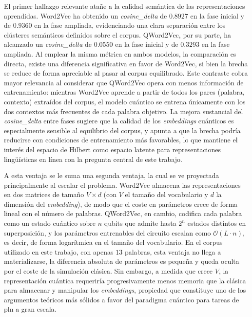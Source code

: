 El primer hallazgo relevante atañe a la calidad semántica de las representaciones aprendidas. Word2Vec ha obtenido un \textit{cosine\_delta} de $0.8927$ en la fase inicial y de $0.9360$ en la fase ampliada, evidenciando una clara separación entre los clústeres semánticos definidos sobre el corpus. QWord2Vec, por su parte, ha alcanzado un \textit{cosine\_delta} de $0.0550$ en la fase inicial y de $0.3293$ en la fase ampliada. Al emplear la misma métrica en ambos modelos, la comparación es directa, existe una diferencia significativa en favor de Word2Vec, si bien la brecha se reduce de forma apreciable al pasar al corpus equilibrado. Este contraste cobra mayor relevancia al considerar que QWord2Vec opera con menos información de entrenamiento: mientras Word2Vec aprende a partir de todos los pares (palabra, contexto) extraídos del corpus, el modelo cuántico se entrena únicamente con los dos contextos más frecuentes de cada palabra objetivo. La mejora sustancial del \textit{cosine\_delta} entre fases sugiere que la calidad de los \textit{embeddings} cuánticos es especialmente sensible al equilibrio del corpus, y apunta a que la brecha podría reducirse con condiciones de entrenamiento más favorables, lo que mantiene el interés del espacio de Hilbert como espacio latente para representaciones lingüísticas en línea con la pregunta central de este trabajo.

A esta ventaja se le suma una segunda ventaja, la cual se ve proyectada principalmente al escalar el problema. Word2Vec almacena las representaciones en dos matrices de tamaño $V \times d$ (con $V$ el tamaño del vocabulario y $d$ la dimensión del \textit{embedding}), de modo que el coste en parámetros crece de forma lineal con el número de palabras. QWord2Vec, en cambio, codifica cada palabra como un estado cuántico sobre $n$ qubits que admite hasta $2^n$ estados distintos en superposición, y los parámetros entrenables del circuito escalan como $\mathcal{O}(L \cdot n)$, es decir, de forma logarítmica en el tamaño del vocabulario. En el corpus utilizado en este trabajo, con apenas $13$ palabras, esta ventaja no llega a materializarse, la diferencia absoluta de parámetros es pequeña y queda oculta por el coste de la simulación clásica. Sin embargo, a medida que crece $V$, la representación cuántica requeriría progresivamente menos memoria que la clásica para almacenar y manipular los \textit{embeddings}, propiedad que constituye uno de los argumentos teóricos más sólidos a favor del paradigma cuántico para tareas de \gls{pln} a gran escala.

